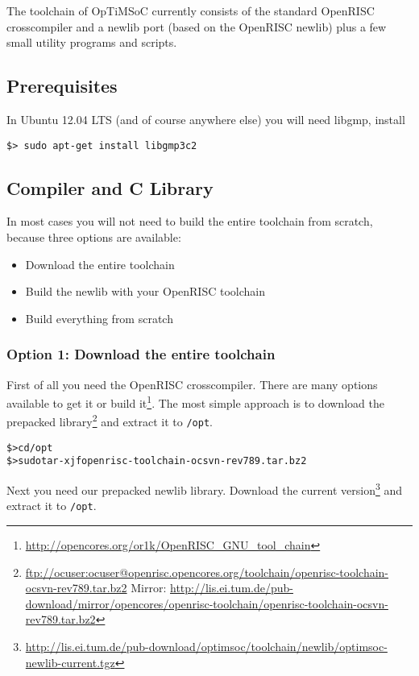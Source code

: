 The toolchain of OpTiMSoC currently consists of the standard OpenRISC
crosscompiler and a newlib port (based on the OpenRISC newlib) plus a
few small utility programs and scripts.

\subsection{Prerequisites}

In Ubuntu 12.04 LTS (and of course anywhere else) you will need
libgmp, install

\begin{verbatim}
$> sudo apt-get install libgmp3c2
\end{verbatim}

\subsection{Compiler and C Library}

In most cases you will not need to build the entire toolchain from
scratch, because three options are available:

\begin{itemize}
\item Download the entire toolchain
\item Build the newlib with your OpenRISC toolchain
\item Build everything from scratch 
\end{itemize}


\subsubsection{Option 1: Download the entire toolchain}
First of all you need the OpenRISC crosscompiler. There are many
options available to get it or build it\footnote{\url{http://opencores.org/or1k/OpenRISC_GNU_tool_chain}}. The most simple
approach is to download the prepacked
library\footnote{\url{ftp://ocuser:ocuser@openrisc.opencores.org/toolchain/openrisc-toolchain-ocsvn-rev789.tar.bz2}
Mirror: \url{http://lis.ei.tum.de/pub-download/mirror/opencores/openrisc-toolchain/openrisc-toolchain-ocsvn-rev789.tar.bz2}} and extract it
to \verb|/opt|.

\begin{alltt}
\$> cd /opt
\$> sudo tar -xjf openrisc-toolchain-ocsvn-rev789.tar.bz2
\end{alltt}

Next you need our prepacked newlib library. Download the current
version\footnote{\url{http://lis.ei.tum.de/pub-download/optimsoc/toolchain/newlib/optimsoc-newlib-current.tgz}}
and extract it to \verb|/opt|.

